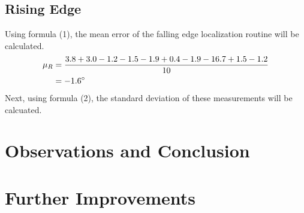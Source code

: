 \documentclass[11pt]{article}
\begin{document}
\subsection{Rising Edge}
Using formula (1), the mean error of the falling edge localization routine will be calculated.
\begin{equation*}
	\begin{aligned}
		\mu_R &= \dfrac{3.8+3.0-1.2-1.5-1.9+0.4-1.9-16.7+1.5-1.2}{10} \\
		&= -1.6 \degree
	\end{aligned}
\end{equation*}
Next, using formula (2), the standard deviation of these measurements will be calcuated.\\
\section{Observations and Conclusion}
\section{Further Improvements}
\end{document}
